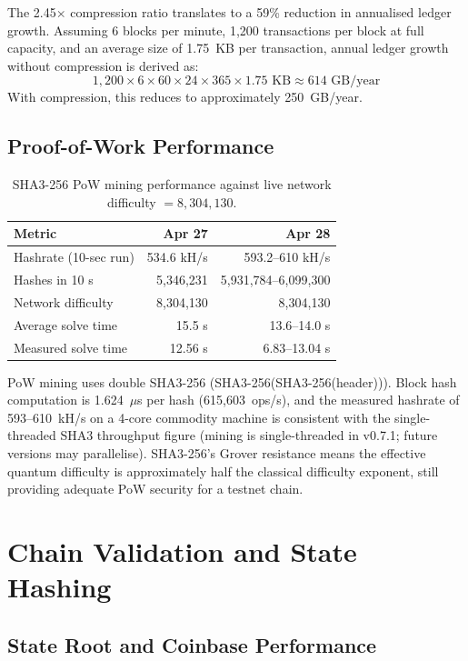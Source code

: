 \documentclass[11pt,a4paper]{article}
\begin{document}
The 2.45$\times$ compression ratio translates to a 59\% reduction in
annualised ledger growth. Assuming 6 blocks per minute, 1,200
transactions per block at full capacity, and an average size of 1.75~KB per transaction, annual ledger growth without
compression is derived as:
\[ 1,200 \times 6 \times 60 \times 24 \times 365 \times 1.75\text{ KB} \approx 614\text{ GB/year} \]
With compression, this reduces to approximately 250~GB/year.

\subsection{Proof-of-Work Performance}

\begin{table}[h]
\centering
\small
\begin{tabular}{@{}lrr@{}}
\toprule
\textbf{Metric} & \textbf{Apr 27} & \textbf{Apr 28} \\
\midrule
Hashrate (10-sec run)      & 534.6 kH/s & 593.2--610 kH/s \\
Hashes in 10 s             & 5,346,231  & 5,931,784--6,099,300 \\
Network difficulty         & 8,304,130  & 8,304,130 \\
Average solve time         & 15.5 s     & 13.6--14.0 s \\
Measured solve time        & 12.56 s    & 6.83--13.04 s \\
\bottomrule
\end{tabular}
\caption{SHA3-256 PoW mining performance against live network difficulty
$= 8{,}304{,}130$.}
\label{tab:pow}
\end{table}

PoW mining uses double SHA3-256 (SHA3-256(SHA3-256(header))). Block hash
computation is 1.624~$\mu$s per hash (615,603~ops/s), and the measured
hashrate of 593--610~kH/s on a 4-core commodity machine is consistent with
the single-threaded SHA3 throughput figure (mining is single-threaded in
v0.7.1; future versions may parallelise). SHA3-256's Grover resistance
means the effective quantum difficulty is approximately half the classical
difficulty exponent, still providing adequate PoW security for a testnet chain.

\section{Chain Validation and State Hashing}
\label{sec:chain}
\subsection{State Root and Coinbase Performance}
\end{document}
